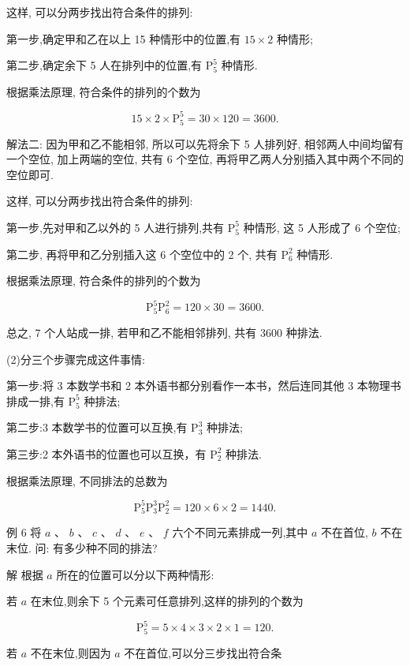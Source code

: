 \documentclass[10pt]{article}
\begin{document}
这样, 可以分两步找出符合条件的排列:

第一步,确定甲和乙在以上 15 种情形中的位置,有 \({15} \times  2\) 种情形;

第二步,确定余下 5 人在排列中的位置,有 \({\mathrm{P}}_{5}^{5}\) 种情形.

根据乘法原理, 符合条件的排列的个数为

\[
{15} \times  2 \times  {\mathrm{P}}_{5}^{5} = {30} \times  {120} = {3600}.
\]

解法二: 因为甲和乙不能相邻, 所以可以先将余下 5 人排列好, 相邻两人中间均留有一个空位, 加上两端的空位, 共有 6 个空位, 再将甲乙两人分别插入其中两个不同的空位即可.

这样, 可以分两步找出符合条件的排列:

第一步,先对甲和乙以外的 5 人进行排列,共有 \({\mathrm{P}}_{5}^{5}\) 种情形, 这 5 人形成了 6 个空位;

第二步, 再将甲和乙分别插入这 6 个空位中的 2 个, 共有 \({\mathrm{P}}_{6}^{2}\) 种情形.

根据乘法原理, 符合条件的排列的个数为

\[
{\mathrm{P}}_{5}^{5}{\mathrm{P}}_{6}^{2} = {120} \times  {30} = {3600}.
\]

总之, 7 个人站成一排, 若甲和乙不能相邻排列, 共有 3600 种排法.

(2)分三个步骤完成这件事情:

第一步:将 3 本数学书和 2 本外语书都分别看作一本书，然后连同其他 3 本物理书排成一排,有 \({\mathrm{P}}_{5}^{5}\) 种排法;

第二步:3 本数学书的位置可以互换,有 \({\mathrm{P}}_{3}^{3}\) 种排法;

第三步:2 本外语书的位置也可以互换，有 \({\mathrm{P}}_{2}^{2}\) 种排法.

根据乘法原理, 不同排法的总数为

\[
{\mathrm{P}}_{5}^{5}{\mathrm{P}}_{3}^{3}{\mathrm{P}}_{2}^{2} = {120} \times  6 \times  2 = {1440}.
\]

例 6 将 \(a\text{ 、 }b\text{ 、 }c\text{ 、 }d\text{ 、 }e\text{ 、 }f\) 六个不同元素排成一列,其中 \(a\) 不在首位, \(b\) 不在末位. 问: 有多少种不同的排法?

解 根据 \(a\) 所在的位置可以分以下两种情形:

若 \(a\) 在末位,则余下 5 个元素可任意排列,这样的排列的个数为

\[
{\mathrm{P}}_{5}^{5} = 5 \times  4 \times  3 \times  2 \times  1 = {120}.
\]

若 \(a\) 不在末位,则因为 \(a\) 不在首位,可以分三步找出符合条
\end{document}
